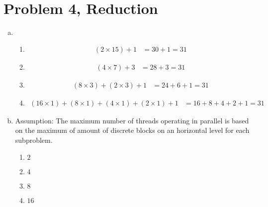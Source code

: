 \documentclass[fontsize=11pt, paper=a4, titlepage]{article}
\begin{document}
\section{Problem 4, Reduction}
\begin{enumerate}[a)]
    \item \begin{enumerate}[A]
        \item \begin{align*}
            (2\times 15) + 1 &= 30 + 1 = 31
        \end{align*}

        \item \begin{align*}
            (4\times 7) + 3 &= 28 + 3 = 31
        \end{align*}

        \item \begin{align*}
            (8\times 3) + (2\times 3) + 1 &= 24 + 6 + 1 = 31
        \end{align*}

        \item \begin{align*}
            (16\times 1) + (8\times 1) + (4\times 1) + (2\times 1) + 1 &=
            16 + 8 + 4 + 2 + 1 = 31
        \end{align*}
    \end{enumerate}

    \item Assumption: The maximum number of threads operating in parallel is
based on the maximum of amount of discrete blocks on an horizontal level for
each subproblem.
    \begin{enumerate}[A]
    \item $2$

    \item $4$

    \item $8$

    \item $16$

    \end{enumerate}


\end{enumerate}
\end{document}
